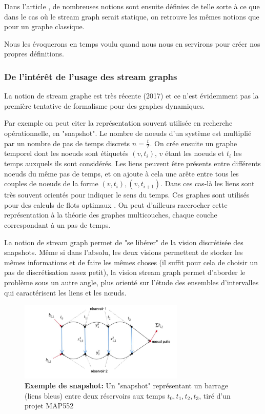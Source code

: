 \documentclass[11pt,a4paper]{article}
\theoremstyle{definition}
\theoremstyle{remark}
\theoremstyle{remark}
\begin{document}
Dans l'article \cite{stream}, de nombreuses notions sont ensuite définies de telle sorte à ce que dans le cas où le stream graph serait statique, on retrouve les mêmes notions que pour un graphe classique.

Nous les évoquerons en temps voulu quand nous nous en servirons pour créer nos propres définitions.

\subsubsection{De l'intérêt de l'usage des stream graphs}
La notion de stream graphe est très récente (2017)\cite{stream} et ce n'est évidemment pas la première tentative de formalisme pour des graphes dynamiques.

Par exemple on peut citer la représentation souvent utilisée en recherche opérationnelle, en "snapshot". Le nombre de noeuds d'un système est multiplié par un nombre de pas de temps discrets $n=\frac{t}{T}$. On crée ensuite un graphe temporel dont les noeuds sont étiquetés $(v,t_i)$, $v$ étant les noeuds et $t_i$ les temps auxquels ils sont considérés. Les liens peuvent être présents entre différents noeuds du même pas de temps, et on ajoute à cela une arête entre tous les couples de noeuds de la forme $(v,t_i),(v,t_{i+1})$. 
Dans ces cas-là les liens sont très souvent orientés pour indiquer le sens du temps. Ces graphes sont utilisés pour des calculs de flots optimaux \cite{map}. On peut d'ailleurs raccrocher cette représentation à la théorie des graphes multicouches, chaque couche correspondant à un pas de temps.

La notion de stream graph permet de "se libérer" de la vision discrétisée des snapshots. Même si dans l'absolu, les deux visions permettent de stocker les mêmes informations et de faire les mêmes choses (il suffit pour cela de choisir un pas de discrétisation assez petit), la vision stream graph permet d'aborder le problème sous un autre angle, plus orienté sur l'étude des ensembles d'intervalles qui caractérisent les liens et les nœuds.

\begin{figure}
\centering
	\includegraphics[width=0.7\textwidth]{snapshot.JPG}
	\caption{\textbf{Exemple de snapshot:} Un "snapshot" représentant un barrage (liens bleus) entre deux réservoirs aux temps $t_0,t_1,t_2,t_3$, tiré d'un projet MAP552}
\end{figure}
\end{document}
